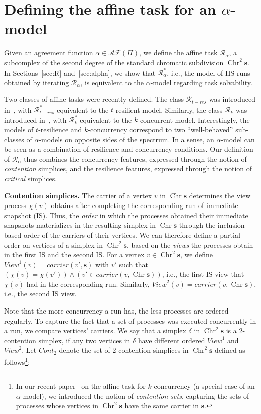 \documentclass[a4paper]{article}
\newcommand{\myparagraph}[1]{\vspace{6pt}\noindent \textbf{#1}}
\def\R{\ensuremath{\mathcal{R}}}
\def\s {\mathbf{s}}
\def\Chr{\operatorname{Chr}}
\def\Car{\mathit{carrier}}
\begin{document}
\section{Defining the affine task for an $\alpha$-model}
\label{sec:def}

Given an agreement function $\alpha\in\mathcal{AF}(\Pi)$, 
we define the affine task $\R_\alpha$, a subcomplex of  
the second degree of the standard chromatic subdivision $\Chr^2\s$. 
In Sections~\ref{sec:R} and~\ref{sec:alpha}, we show that $\R_\alpha^*$, 
i.e., the model of IIS runs obtained by iterating $\R_\alpha$, is equivalent to 
the $\alpha$-model regarding task solvability.

Two classes of affine tasks were recently defined.
The class $\R_{t-res}$ was introduced in~\cite{SHG16}, with
$\R_{t-res}^*$ equivalent to the $t$-resilient model. 
Similarly, the class $\R_k$ was introduced in~\cite{GHKR16}, 
with $\R_k^*$ equivalent to the $k$-concurrent model.
%
Interestingly, the models of $t$-resilience and $k$-concurrency correspond to 
two ``well-behaved'' sub-classes of $\alpha$-models on opposite sides of the spectrum. 
In a sense, an $\alpha$-model can be seen as 
a combination of resilience and concurrency conditions. 
Our definition of $\R_\alpha$
thus combines the concurrency features, expressed through the notion of
\emph{contention} simplices, and the resilience features, expressed
through the notion of \emph{critical} simplices.


\myparagraph{Contention simplices.}
The carrier of a vertex $v$ in $\Chr\s$ determines the view
process $\chi(v)$ obtains after completing the corresponding run of
immediate snapshot (IS).
%
Thus, the \emph{order} in which the processes obtained their immediate snapshots 
materializes in the resulting simplex in $\Chr\s$ through the inclusion-based order of 
the carriers of their vertices. We can therefore define a partial order 
on vertices of a simplex in $\Chr^2\s$, based on the
\emph{views} the processes obtain in the first IS and the
second IS.
%
For a vertex $v\in\Chr^2\s$, we define $\mathit{View}^1(v)=\Car(v',\s)$ 
with $v'$ such that $(\chi(v)=\chi(v'))\wedge(v'\in \Car(v,\Chr \s))$,
i.e., the first IS view that $\chi(v)$ had
in the corresponding run.
%
Similarly, $\mathit{View}^2(v) = \Car(v,\Chr\s)$, i.e., the second IS view.

Note that the more concurrency a run has,
the less processes are ordered regularly.
To capture the fact that a set of processes
was executed concurrently in a run, we compare vertices'
carriers.
%
We say that a simplex $\delta$ in $\Chr^2\s$ is a $2$-contention
simplex, if any two vertices in $\delta$ have different ordered
$\mathit{View}^1$ and $\mathit{View}^2$.
Let ${\mathit{Cont}_2}$ denote the set of $2$-contention simplices in
$\Chr^2 \s$ defined as follows\footnote{In our recent
  paper~\cite{GHKR16} on the affine task for $k$-concurrency (a
  special case of an $\alpha$-model), we introduced the notion of \emph{contention
    sets}, capturing the sets of processes whose vertices in $\Chr^2\s$ have the same carrier
  in $\s$.}:
\end{document}

